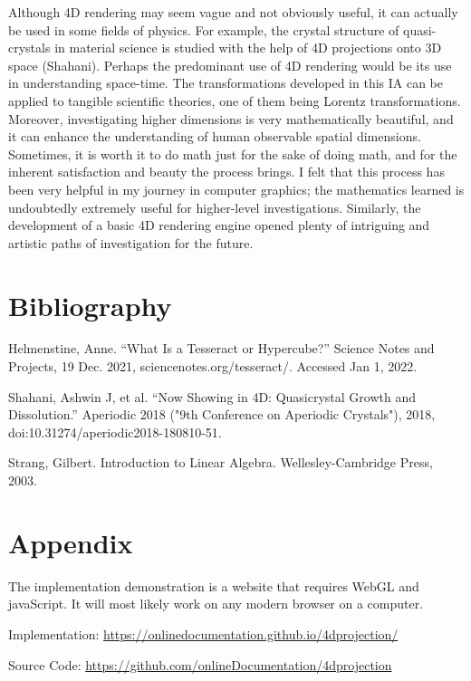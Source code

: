 \documentclass[12pt, letterpaper]{article}
\begin{document}
Although 4D rendering may seem vague and not obviously useful, it can actually be used in some fields of physics. For example, the crystal structure of quasi-crystals in material science is studied with the help of 4D projections onto 3D space (Shahani). Perhaps the predominant use of 4D rendering would be its use in understanding space-time. The transformations developed in this IA can be applied to tangible scientific theories, one of them being Lorentz transformations. Moreover, investigating higher dimensions is very mathematically beautiful, and it can enhance the understanding of human observable spatial dimensions. Sometimes, it is worth it to do math just for the sake of doing math, and for the inherent satisfaction and beauty the process brings. I felt that this process has been very helpful in my journey in computer graphics; the mathematics learned is undoubtedly extremely useful for higher-level investigations. Similarly, the development of a basic 4D rendering engine opened plenty of intriguing and artistic paths of investigation for the future. 
\clearpage

\section{Bibliography}
\noindent
\vspace{-2em}
\setlength{\parindent}{-0.5in}
\setlength{\leftskip}{0.5in}

Helmenstine, Anne. “What Is a Tesseract or Hypercube?” Science Notes and Projects, 19 Dec. 2021, sciencenotes.org/tesseract/.  Accessed Jan 1, 2022.

Shahani, Ashwin J, et al. “Now Showing in 4D: Quasicrystal Growth and Dissolution.” Aperiodic 2018 ("9th Conference on Aperiodic Crystals"), 2018, doi:10.31274/aperiodic2018-180810-51. 

Strang, Gilbert. Introduction to Linear Algebra. Wellesley-Cambridge Press, 2003.

\vspace{1em}
\setlength{\parindent}{0.5in}
\setlength{\leftskip}{0cm}

\section{Appendix}

The implementation demonstration is a website that requires WebGL and javaScript. It will most likely work on any modern browser on a computer.

\noindent Implementation: \url{https://onlinedocumentation.github.io/4dprojection/}

\noindent Source Code: \url{https://github.com/onlineDocumentation/4dprojection}
\end{document}
